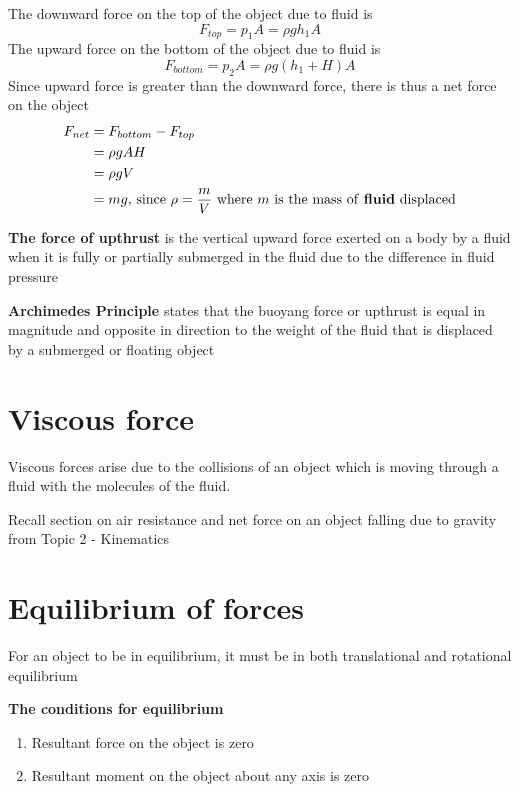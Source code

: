 \documentclass[a4paper, 10pt]{article}
\begin{document}
The downward force on the top of the object due to fluid is 
\[
   F_{top} = p_1 A = \rho gh_1 A
\]
The upward force on the bottom of the object due to fluid is 
\[
   F_{bottom} = p_2 A = \rho g(h_1 + H)A
\]
Since upward force is greater than the downward force, there is thus a net force on the object
\begin{align*}
   F_{net} &= F_{bottom} - F_{top} \\
           &= \rho gAH \\
           &= \rho gV \\
           &= mg \text{, since $\rho = \frac{m}{V}$ where $m$ is the mass of \textbf{fluid} displaced}
\end{align*}	
\begin{framed}
   \textbf{The force of upthrust} is the vertical upward force exerted on a body by a fluid when it is fully or partially submerged in the fluid due to the difference in fluid pressure
\end{framed}	

\begin{framed}
   \textbf{Archimedes Principle} states that the buoyang force or upthrust is equal in magnitude and opposite in direction to the weight of the fluid that is displaced by a submerged or floating object
\end{framed}	

\section{Viscous force}
Viscous forces arise due to the collisions of an object which is moving through a fluid with the molecules of the fluid. 

Recall section on air resistance and net force on an object falling due to gravity from Topic 2 - Kinematics

\section{Equilibrium of forces}
For an object to be in equilibrium, it must be in both translational and rotational equilibrium

\begin{framed}
   \textbf{The conditions for equilibrium}
   \begin{enumerate}
      \item Resultant force on the object is zero
      \item Resultant moment on the object about any axis is zero
   \end{enumerate}	
\end{framed}
\end{document}
